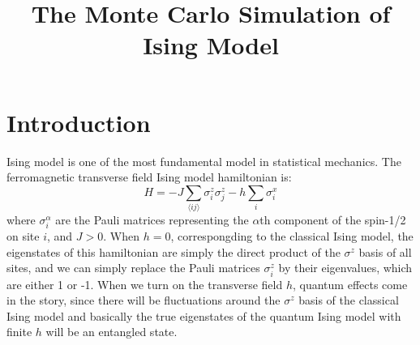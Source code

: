 \documentclass{article}
\title{The Monte Carlo Simulation of Ising Model}
\author{}
\date{}
\theoremstyle{plain} \newtheorem{thm}{Theorem}[section]
\theoremstyle{definition} \newtheorem{df}{Definition}[section]
\theoremstyle{definition} \newtheorem{eg}{Example}
\theoremstyle{remark} \newtheorem*{rmk}{Remark}
\begin{document}
\maketitle


\section{Introduction}
Ising model is one of the most fundamental model in statistical mechanics. The ferromagnetic transverse field Ising model hamiltonian is:
\begin{equation}
	H=-J\sum_{\langle ij\rangle}\sigma^z_i\sigma^z_j-h\sum_i\sigma_i^x
\end{equation}
where $\sigma_i^\alpha$ are the Pauli matrices representing the $\alpha$th component of the spin-1/2 on site $i$, and $J>0$. When $h=0$, correspongding to the classical Ising model, the eigenstates of this hamiltonian are simply the direct product of the $\sigma^z$ basis of all sites, and we can simply replace the Pauli matrices $\sigma_i^z$ by their eigenvalues, which are either 1 or -1. When we turn on the transverse field $h$, quantum effects come in the story, since there will be fluctuations around the $\sigma^z$ basis of the classical Ising model and basically the true eigenstates of the quantum Ising model with finite $h$ will be an entangled state. 
\end{document}
